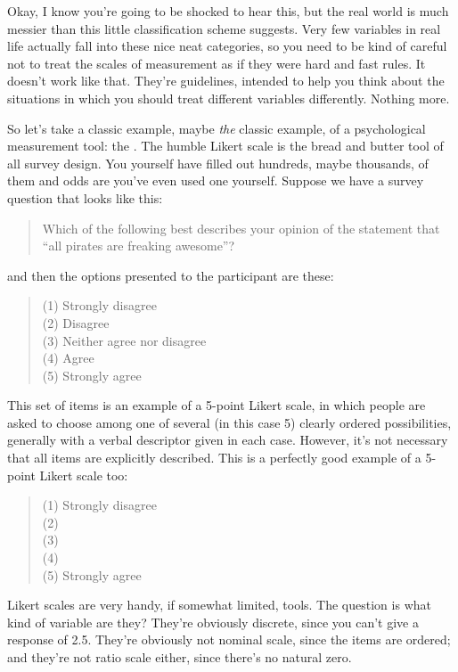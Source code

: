 Okay, I know you're going to be shocked to hear this, but the real world is much messier than this little classification scheme suggests. Very few variables in real life actually fall into these nice neat categories, so you need to be kind of careful not to treat the scales of measurement as if they were hard and fast rules. It doesn't work like that. They're guidelines, intended to help you think about the situations in which you should treat different variables differently. Nothing more. 

So let's take a classic example, maybe {\it the} classic example, of a psychological measurement tool: the . The humble Likert scale is the bread and butter tool of all survey design. You yourself have filled out hundreds, maybe thousands, of them and odds are you've even used one yourself. Suppose we have a survey question that looks like this:

\begin{quote}
Which of the following best describes your opinion of the statement that ``all pirates are freaking awesome''?
\end{quote}
and then the options presented to the participant are these:
\begin{quote}
(1) Strongly disagree\\
(2) Disagree\\
(3) Neither agree nor disagree\\
(4) Agree\\
(5) Strongly agree
\end{quote}
This set of items is an example of a 5-point Likert scale, in which people are asked to choose among one of several (in this case 5) clearly ordered possibilities, generally with a verbal descriptor given in each case. However, it's not necessary that all items are explicitly described. This is a perfectly good example of a 5-point Likert scale too: 
\begin{quote}
(1) Strongly disagree\\
(2) \\ (3) \\ (4) \\
(5) Strongly agree
\end{quote}

Likert scales are very handy, if somewhat limited, tools. The question is what kind of variable are they? They're obviously discrete, since you can't give a response of 2.5. They're obviously not nominal scale, since the items are ordered; and they're not ratio scale either, since there's no natural zero. 

